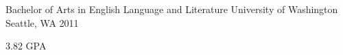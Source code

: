 


\begin{cventries}


\cventry
{Bachelor of Arts in English Language and Literature} %
{University of Washington} %
{Seattle, WA} %
{2011} %
{ %
\begin{cvitems}
\item {3.82 GPA}
\end{cvitems}
}


\end{cventries}
